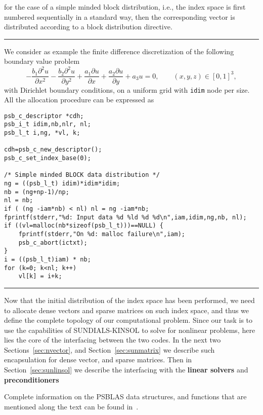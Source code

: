 \documentclass[twoside,a4paper]{refart}
\begin{document}
	for the case of a simple minded block distribution, i.e., the index space is first numbered sequentially in a standard way, then the corresponding vector is distributed according to a block distribution directive. 
	
\noindent\rule{\columnwidth}{0.4pt}
We consider as example the finite difference discretization of the following boundary value problem
\begin{equation*}
	- \frac{b_1 \partial^2 u}{\partial x^2} - \frac{b_2 \partial^2 u}{\partial y^2} + \frac{a_1 \partial u}{\partial x} + \frac{a_2 \partial u}{\partial y} + a_3 u = 0, \qquad (x,y,z) \in [0,1]^3,
\end{equation*}
with Dirichlet boundary conditions, on a uniform grid with \lstinline[style=CStyle]|idim| node per size. All the allocation procedure can be expressed as
\begin{lstlisting}[style=CStyle]
psb_c_descriptor *cdh;
psb_i_t idim,nb,nlr, nl;
psb_l_t i,ng, *vl, k;

cdh=psb_c_new_descriptor();
psb_c_set_index_base(0);

/* Simple minded BLOCK data distribution */ 
ng = ((psb_l_t) idim)*idim*idim;  
nb = (ng+np-1)/np;
nl = nb;
if ( (ng -iam*nb) < nl) nl = ng -iam*nb; 
fprintf(stderr,"%d: Input data %d %ld %d %d\n",iam,idim,ng,nb, nl);
if ((vl=malloc(nb*sizeof(psb_l_t)))==NULL) {
	fprintf(stderr,"On %d: malloc failure\n",iam);
	psb_c_abort(ictxt);
}
i = ((psb_l_t)iam) * nb;
for (k=0; k<nl; k++)
	vl[k] = i+k; 
\end{lstlisting}
\noindent\rule{\columnwidth}{0.4pt}	

	Now that the initial distribution of the index space has been performed, we need to allocate  dense vectors and sparse matrices on such index space, and thus we define the complete topology of our computational problem. Since our task is to use the capabilities of SUNDIALS-KINSOL to solve for nonlinear problems, here lies the core of the interfacing between the two codes. In the next two Sections~\ref{sec:nvector}, and Section~\ref{sec:sunmatrix} we describe such encapsulation for dense vector, and sparse matrices. Then in Section~\ref{sec:sunlinsol} we describe the interfacing with the \textbf{linear solvers} and \textbf{preconditioners} 

	Complete information on the PSBLAS data structures, and functions that are mentioned along the text can be found in~\cite{psblasguide}.
	
\end{document}
